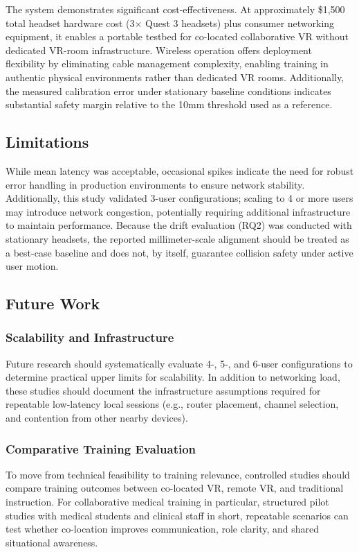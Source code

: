 \documentclass[conference]{IEEEtran}
\begin{document}
The system demonstrates significant cost-effectiveness. At approximately \$1,500 total headset hardware cost (3$\times$ Quest 3 headsets) plus consumer networking equipment, it enables a portable testbed for co-located collaborative VR without dedicated VR-room infrastructure. Wireless operation offers deployment flexibility by eliminating cable management complexity, enabling training in authentic physical environments rather than dedicated VR rooms. Additionally, the measured calibration error under stationary baseline conditions indicates substantial safety margin relative to the 10mm threshold used as a reference.

\subsection{Limitations}

While mean latency was acceptable, occasional spikes indicate the need for robust error handling in production environments to ensure network stability. Additionally, this study validated 3-user configurations; scaling to 4 or more users may introduce network congestion, potentially requiring additional infrastructure to maintain performance.
Because the drift evaluation (RQ2) was conducted with stationary headsets, the reported millimeter-scale alignment should be treated as a best-case baseline and does not, by itself, guarantee collision safety under active user motion.


\subsection{Future Work}

\subsubsection{Scalability and Infrastructure}
Future research should systematically evaluate 4-, 5-, and 6-user configurations to determine practical upper limits for scalability. In addition to networking load, these studies should document the infrastructure assumptions required for repeatable low-latency local sessions (e.g., router placement, channel selection, and contention from other nearby devices).

\subsubsection{Comparative Training Evaluation}
To move from technical feasibility to training relevance, controlled studies should compare training outcomes between co-located VR, remote VR, and traditional instruction. For collaborative medical training in particular, structured pilot studies with medical students and clinical staff in short, repeatable scenarios can test whether co-location improves communication, role clarity, and shared situational awareness.
\end{document}
